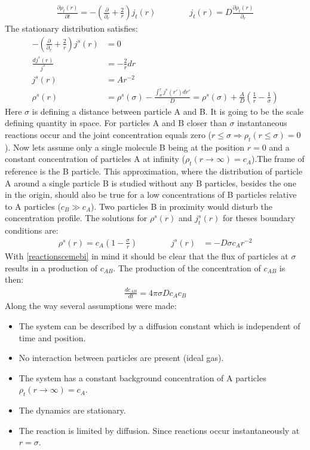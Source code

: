 \documentclass[
  a4paper,BCOR10mm,oneside,
  headsepline,footsepline,%
  fleqn,openbib
]{scrbook}
\begin{document}
\begin{align} \label{smoluchwoskionedimension}
\frac{\partial \rho_t(r)}{\partial t}=-\left(\frac{\partial}{\partial_r}+\frac{2}{r} \right) j_t(r) \qquad \qquad j_t(r)=D \frac{\partial\rho_t(r)}{\partial_r}
\end{align}
 The stationary distribution satisfies:
\begin{align}
 -\left(\frac{\partial}{\partial_r}+\frac{2}{r} \right) j^{s}(r)&= 0\\
 \frac{d j^{s}(r)}{j^{s}}  &=- \frac{2}{r} dr\\
 j^{s}(r)&=A r^{-2}\\
 \rho^s(r)&=\rho^s(\sigma)- \frac{\int_{\sigma}^{r} j^{s}(r')dr'}{D}=\rho^s(\sigma)+\frac{A}{D}\left(\frac{1}{r}-\frac{1}{\sigma}\right)
\end{align}
Here $\sigma$ is defining a distance between particle A and B. It is going to be the scale defining quantity in space. For particles A and B closer than $\sigma$ instantaneous reactions occur and the joint concentration equals zero ($r\leq \sigma \Rightarrow \rho_t(r \leq \sigma)=0$). Now lets assume only a single molecule B being at the position $r=0$ and a constant concentration of particles A at infinity ($\rho_t(r \rightarrow \infty)=c_A$).The frame of reference is the B particle. This approximation, where the distribution of particle A around a single particle B is studied without any B particles, besides the one in the origin, should also be true for a low concentrations of B particles relative to A particles ($c_B\gg c_A$). Two particles B in proximity would disturb the concentration profile. The solutions for $\rho^{s}(r)$ and $j^{s}_t(r)$ for theses boundary conditions are:
\begin{align}
 \rho^{s}(r)=c_A \left(1-\frac{\sigma}{r}\right) \qquad \qquad j^{s}(r)&=-D \sigma c_A r^{-2}
 \label{smoluchwoskiproblem}
\end{align}
With \cref{reactionscemebi} in mind it should be clear that the flux of particles at $\sigma$ results in a production of $c_{AB}$. The production of the concentration of $c_{AB}$ is then: 
\begin{align}
 \frac{d c_{AB} }{dt}=4 \pi \sigma D c_A c_B \label{difkinetics}
\end{align}
Along the way several assumptions were made:
\begin{itemize}
  \item The system can be described by a diffusion constant which is independent of time and position. 
  \item No interaction between particles are present (ideal gas).
  \item The system has a constant background concentration of A particles $\rho_t(r \rightarrow \infty)=c_A$.
  \item The dynamics are stationary.
  \item The reaction is limited by diffusion. Since reactions occur instantaneously at $r=\sigma$. 
\end{itemize}
\end{document}
